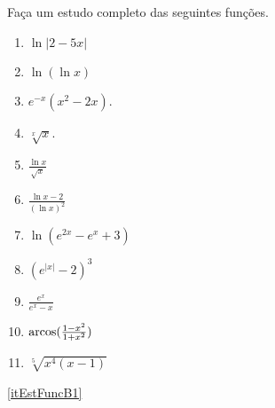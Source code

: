 \begin{exo}
Faça um estudo completo das seguintes funções.
\begin{multicols}{3}
\begin{enumerate}
\item\label{itEstFuncB1} $\ln |2-5x|$
\item\label{itEstFuncB3} $\ln(\ln x)$
\item\label{itEstFuncB7} $e^{-x}(x^2-2x)$.
\item\label{itEstFuncB70} $\sqrt[x]{x}$.
\item\label{itEstFuncB4} $\frac{\ln x}{\sqrt{x}}$
\item\label{itEstFuncB5} $\frac{\ln x-2}{(\ln x)^2}$
\item\label{itEstFuncB2} $\ln(e^{2x}-e^x+3)$
\item\label{itEstFuncB29} $(e^{|x|}-2)^3$
\item\label{itEstFuncB33} $\frac{e^x}{e^x-x}$
\item\label{itEstFuncB33a} $\operatorname{arcos}(\frac{1-x^2}{1+x^2})$
\item\label{itEstFuncB36} $\sqrt[5]{x^4(x-1)}$
\end{enumerate}
\end{multicols}
\vspace{0.01cm}

\begin{sol}
\eqref{itEstFuncB1}
\begin{center}
\begin{bmlimage}\end{bmlimage}
\end{center}



\end{sol}
\end{exo}
